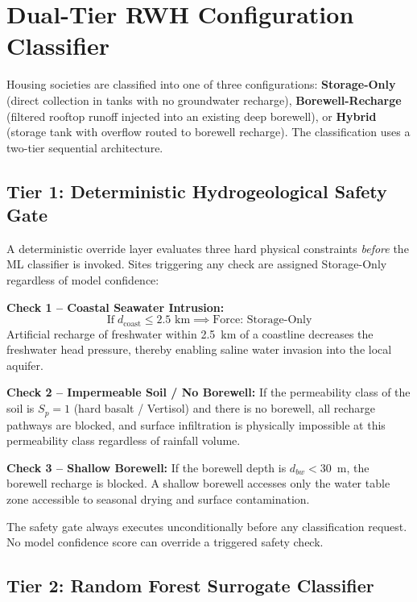 \documentclass[conference]{IEEEtran}
\begin{document}
\section{Dual-Tier RWH Configuration Classifier}
\label{sec:classifier}

Housing societies are classified into one of three configurations:
\textbf{Storage-Only} (direct collection in tanks with no groundwater
recharge), \textbf{Borewell-Recharge} (filtered rooftop runoff injected into
an existing deep borewell), or \textbf{Hybrid} (storage tank with overflow
routed to borewell recharge). The classification uses a two-tier sequential
architecture.

\subsection{Tier 1: Deterministic Hydrogeological Safety Gate}

A deterministic override layer evaluates three hard physical constraints
\textit{before} the ML classifier is invoked. Sites triggering any check are
assigned Storage-Only regardless of model confidence:

\textbf{Check 1 -- Coastal Seawater Intrusion:}
\begin{equation}
  \text{If}\;d_{\text{coast}} \le 2.5\text{ km}
  \implies \text{Force: Storage-Only}
  \label{eq:coastal}
\end{equation}
Artificial recharge of freshwater within 2.5~km of a coastline decreases the freshwater head pressure, thereby enabling saline water invasion into the local aquifer.

\textbf{Check 2 -- Impermeable Soil / No Borewell:} If the permeability class of the soil is $S_p = 1$ (hard basalt / Vertisol) and there is no borewell, all recharge pathways are blocked, and surface infiltration is physically impossible at this permeability class regardless of rainfall volume.

\textbf{Check 3 -- Shallow Borewell:} If the borewell depth is $d_{bw} < 30$~m, the borewell recharge is blocked. A shallow borewell accesses only the water table zone accessible to seasonal drying and surface contamination.

The safety gate always executes unconditionally before any classification request. No model confidence score can override a triggered safety check.

\subsection{Tier 2: Random Forest Surrogate Classifier}
\end{document}
